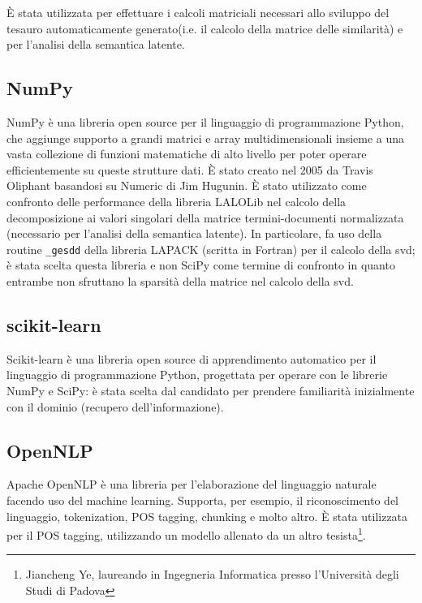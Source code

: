 È stata utilizzata per effettuare i calcoli matriciali necessari allo sviluppo del tesauro automaticamente generato(i.e. il calcolo della matrice delle similarità) e per l'analisi della semantica latente.


\subsection{NumPy}
NumPy è una libreria open source per il linguaggio di programmazione Python, che aggiunge supporto a grandi matrici e array multidimensionali insieme a una vasta collezione di funzioni matematiche di alto livello per poter operare efficientemente su queste strutture dati. È stato creato nel 2005 da Travis Oliphant basandosi su Numeric di Jim Hugunin. È stato utilizzato come confronto delle performance della libreria LALOLib nel calcolo della decomposizione ai valori singolari della matrice termini-documenti normalizzata (necessario per l'analisi della semantica latente). In particolare, fa uso della routine \texttt{\_gesdd} della libreria LAPACK (scritta in Fortran) per il calcolo della \gls{svd}; è stata scelta questa libreria e non SciPy come termine di confronto in quanto entrambe non sfruttano la sparsità della matrice nel calcolo della \gls{svd}.

\subsection{scikit-learn}
Scikit-learn è una libreria open source di apprendimento automatico per il linguaggio di programmazione Python, progettata per operare con le librerie NumPy e SciPy: è stata scelta dal candidato per prendere familiarità inizialmente con il dominio (recupero dell'informazione).

\subsection{OpenNLP}
Apache OpenNLP è una libreria per l'elaborazione del linguaggio naturale facendo uso del machine learning.
Supporta, per esempio, il riconoscimento del linguaggio, tokenization, POS tagging, chunking e molto altro. È stata utilizzata per il POS tagging, utilizzando un modello allenato da un altro tesista\footnote{Jiancheng Ye, laureando in Ingegneria Informatica presso l'Università degli Studi di Padova}.

